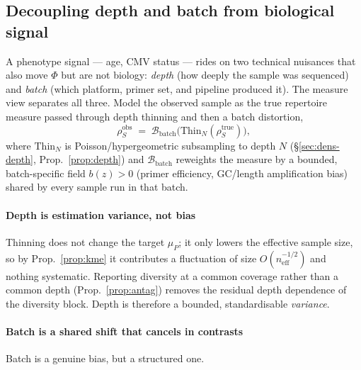 \documentclass[11pt]{article}
\theoremstyle{oldplain}
\theoremstyle{oldrem}
\begin{document}
\subsection{Decoupling depth and batch from biological signal}\label{sec:samp-decouple}

A phenotype signal --- age, {\scshape CMV} status --- rides on two technical nuisances that also move $\Phi$
but are not biology: \emph{depth} (how deeply the sample was sequenced) and \emph{batch} (which platform,
primer set, and pipeline produced it). The measure view separates all three. Model the observed sample as the
true repertoire measure passed through depth thinning and then a batch distortion,
\begin{equation}\label{eq:nuisance}
  \rho^{\mathrm{obs}}_S \;=\; \mathcal B_{\mathrm{batch}}\!\big(\mathrm{Thin}_N(\rho^{\mathrm{true}}_S)\big),
\end{equation}
where $\mathrm{Thin}_N$ is Poisson/hypergeometric subsampling to depth $N$ (\S\ref{sec:dens-depth},
Prop.~\ref{prop:depth}) and $\mathcal B_{\mathrm{batch}}$ reweights the measure by a bounded, batch-specific
field $b(z)>0$ (primer efficiency, {\scshape GC}/length amplification bias) shared by every sample run in that
batch.

\paragraph{Depth is estimation variance, not bias} Thinning does not change the target $\mu_P$; it only lowers
the effective sample size, so by Prop.~\ref{prop:kme} it contributes a fluctuation of size
$O(n_{\mathrm{eff}}^{-1/2})$ and nothing systematic. Reporting diversity at a common coverage rather than a
common depth (Prop.~\ref{prop:antag}) removes the residual depth dependence of the diversity block. Depth is
therefore a bounded, standardisable \emph{variance}.

\paragraph{Batch is a shared shift that cancels in contrasts} Batch is a genuine bias, but a structured one.
\end{document}
